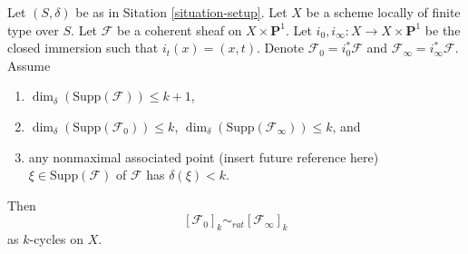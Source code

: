 \begin{lemma}
\label{lemma-coherent-sheaf-cross-p1}
Let $(S, \delta)$ be as in Sitation \ref{situation-setup}.
Let $X$ be a scheme locally of finite type over $S$.
Let $\mathcal{F}$ be a coherent sheaf on $X \times \mathbf{P}^1$.
Let $i_0, i_\infty : X \to X \times \mathbf{P}^1$ be the closed immersion
such that $i_t(x) = (x, t)$. Denote $\mathcal{F}_0 = i_0^*\mathcal{F}$ and
$\mathcal{F}_\infty = i_\infty^*\mathcal{F}$.
Assume
\begin{enumerate}
\item $\dim_\delta(\text{Supp}(\mathcal{F})) \leq k + 1$,
\item $\dim_\delta(\text{Supp}(\mathcal{F}_0)) \leq k$,
$\dim_\delta(\text{Supp}(\mathcal{F}_\infty)) \leq k$, and
\item any nonmaximal associated point
(insert future reference here) $\xi \in \text{Supp}(\mathcal{F})$
of $\mathcal{F}$ has $\delta(\xi) < k$.
\end{enumerate}
Then
$$
[\mathcal{F}_0]_k \sim_{rat} [\mathcal{F}_\infty]_k
$$
as $k$-cycles on $X$.
\end{lemma}


